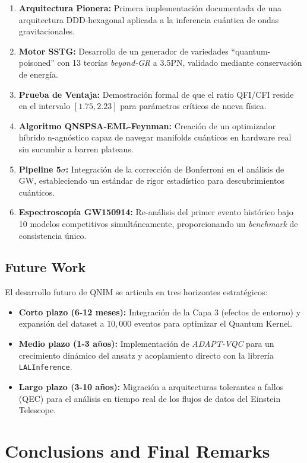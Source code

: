 \documentclass[11pt,a4paper,spanish]{book}
\numberwithin{equation}{chapter}
\numberwithin{figure}{chapter}
\numberwithin{equation}{chapter}
\numberwithin{figure}{chapter}
\numberwithin{table}{chapter}
\begin{document}
\begin{enumerate}[label=\textbf{C\arabic*:}]
    \item \textbf{Arquitectura Pionera:} Primera implementación documentada de una arquitectura DDD-hexagonal aplicada a la inferencia cuántica de ondas gravitacionales.
    \item \textbf{Motor SSTG:} Desarrollo de un generador de variedades ``quantum-poisoned'' con 13 teorías \textit{beyond-GR} a 3.5PN, validado mediante conservación de energía.
    \item \textbf{Prueba de Ventaja:} Demostración formal de que el ratio QFI/CFI reside en el intervalo $[1.75, 2.23]$ para parámetros críticos de nueva física.
    \item \textbf{Algoritmo QNSPSA-EML-Feynman:} Creación de un optimizador híbrido n-agnóstico capaz de navegar manifolds cuánticos en hardware real sin sucumbir a barren plateaus.
    \item \textbf{Pipeline 5$\sigma$:} Integración de la corrección de Bonferroni en el análisis de GW, estableciendo un estándar de rigor estadístico para descubrimientos cuánticos.
    \item \textbf{Espectroscopía GW150914:} Re-análisis del primer evento histórico bajo 10 modelos competitivos simultáneamente, proporcionando un \textit{benchmark} de consistencia único.
\end{enumerate}

\section{Future Work}

El desarrollo futuro de QNIM se articula en tres horizontes estratégicos:
\begin{itemize}
    \item \textbf{Corto plazo (6-12 meses):} Integración de la Capa 3 (efectos de entorno) y expansión del dataset a $10,000$ eventos para optimizar el Quantum Kernel.
    \item \textbf{Medio plazo (1-3 años):} Implementación de \textit{ADAPT-VQC} para un crecimiento dinámico del ansatz y acoplamiento directo con la librería \texttt{LALInference}.
    \item \textbf{Largo plazo (3-10 años):} Migración a arquitecturas tolerantes a fallos (QEC) para el análisis en tiempo real de los flujos de datos del Einstein Telescope.
\end{itemize}

\chapter{Conclusions and Final Remarks}
\label{chap:conclusions}
\end{document}
